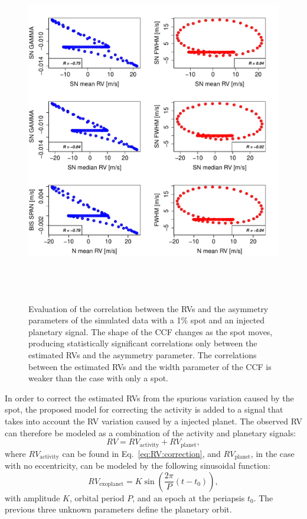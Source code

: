 \documentclass{aa}
\begin{document}
\begin{figure}[htbp]
\begin{center}
\includegraphics[height = 6in]{SOAP_SPOT_PLANET_Comparison_para_SN.pdf} 
   \caption{Evaluation of the correlation between the RVs and the asymmetry parameters of the simulated data with a 1\% spot and an injected planetary signal.  The shape of the CCF changes as the spot moves, producing statistically significant correlations only between the estimated RVs and the asymmetry parameter. The correlations between the estimated RVs and the width parameter of the CCF is weaker than the case with only a spot.}
    \label{fig:spot.plus.planet.corr}
\end{center}
\end{figure}

In order to correct the estimated RVs from the spurious variation caused by the spot, the proposed model for correcting the activity is added to a signal that takes into account the RV variation caused by a injected planet. The observed RV can therefore be modeled as a combination of the activity and planetary signals:
%
\begin{equation}
RV= RV_{\text{activity}} + RV_{\text{planet}},
\label{eq:RV:correction.overall}
\end{equation}
%
where $RV_{\text{activity}}$ can be found in Eq.~\ref{eq:RV:correction}, and $RV_{\text{planet}}$, in the case with no eccentricity, can be modeled by the following sinusoidal function:
%
\begin{equation}
RV_{\text{exoplanet}}= K \sin \left(\frac{2 \pi}{P} (t - t_{0})\right),
\label{eq:RV:correction.planet}
\end{equation}
%
with amplitude $K$, orbital period $P$, and an epoch at the periapsis $t_{0}$.  The previous three unknown parameters define the planetary orbit.
\end{document}
